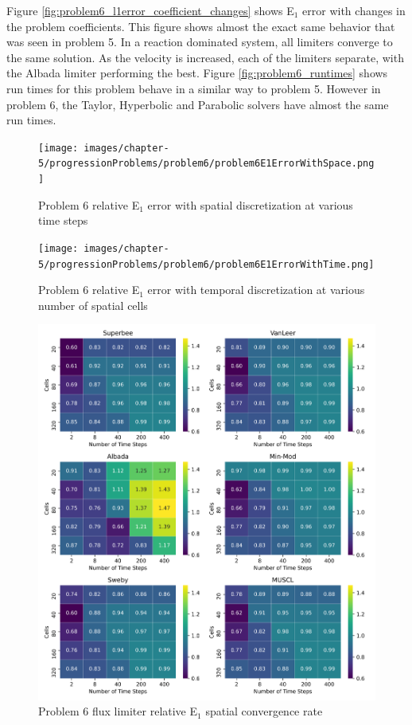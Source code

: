 Figure \ref{fig:problem6_l1error_coefficient_changes} shows E${}_{1}$ error with changes in the problem coefficients. This figure shows almost the exact same behavior that was seen in problem 5. In a reaction dominated system, all limiters converge to the same solution. As the velocity is increased, each of the limiters separate, with the Albada limiter performing the best. Figure \ref{fig:problem6_runtimes} shows run times for this problem behave in a similar way to problem 5. However in problem 6, the Taylor, Hyperbolic and Parabolic solvers have almost the same run times.

\clearpage

\begin{figure}[p]
    \centering
    \texttt{[image: images/chapter-5/progressionProblems/problem6/problem6E1ErrorWithSpace.png]}
    \caption{Problem 6 relative E${}_{1}$ error with spatial discretization at various time steps}
    \label{fig:problem6_l1error_spatial_results}
\end{figure}

\clearpage

\begin{figure}[p]
    \centering
    \texttt{[image: images/chapter-5/progressionProblems/problem6/problem6E1ErrorWithTime.png]}
    \caption{Problem 6 relative E${}_{1}$ error with temporal discretization at various number of spatial cells}
    \label{fig:problem6_l1error_time_results}
\end{figure}

\clearpage

\begin{figure}[p]
    \centering
    \includegraphics[width=6in]{images/chapter-5/progressionProblems/problem6/problem6E1FluxLimiterConvergenceRate.png}
    \caption{Problem 6 flux limiter relative E${}_{1}$ spatial convergence rate}
    \label{fig:problem6_l1error_fluxlimiter_convergence_rate}
\end{figure}

